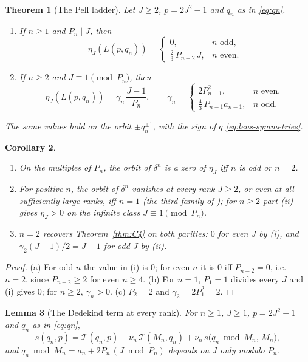 \documentclass[11pt]{article}
\newtheorem{theorem}{Theorem}[section]
\newtheorem{lemma}[theorem]{Lemma}
\newtheorem{corollary}[theorem]{Corollary}
\theoremstyle{definition}
\begin{document}
\begin{theorem}[The Pell ladder]
\label{thm:P}
Let $J\geq2$, $p=2J^2-1$ and $q_n$ as in \eqref{eq:qn}.
\begin{enumerate}[label=(\roman*)]
\item If $n\geq1$ and $P_n\mid J$, then
\[
 \eta_J(L(p,q_n))=\begin{cases}0,&n\text{ odd},\\[2pt]
 \tfrac23\,P_{n-2}\,J,&n\text{ even}.\end{cases}
\]
\item If $n\geq2$ and $J\equiv1\pmod{P_n}$, then
\[
 \eta_J(L(p,q_n))=\gamma_n\,\frac{J-1}{P_n},\qquad
 \gamma_n=\begin{cases}2P_{n-1}^2,&n\text{ even},\\[2pt]
 \tfrac43\,P_{n-1}a_{n-1},&n\text{ odd}.\end{cases}
\]
\end{enumerate}
The same values hold on the orbit $\pm q_n^{\pm1}$, with the sign of $q$
\eqref{eq:lens-symmetries}.
\end{theorem}

\begin{corollary}
\label{cor:P}
\begin{enumerate}[label=(\alph*)]
\item On the multiples of $P_n$, the orbit of $\delta^n$ is a zero of
$\eta_J$ iff $n$ is odd or $n=2$.
\item For positive $n$, the orbit of $\delta^n$ vanishes at every rank
$J\geq2$, or even at all sufficiently large ranks, iff $n=1$ (the third family of
\cite[Thm.~7.1]{MahmoodP1Collection2026}); for $n\geq2$ part (ii) gives
$\eta_J>0$ on the infinite class $J\equiv1\pmod{P_n}$.
\item $n=2$ recovers Theorem~\ref{thm:C4} on both parities: $0$ for even
$J$ by (i), and $\gamma_2(J-1)/2=J-1$ for odd $J$ by (ii).
\end{enumerate}
\end{corollary}

\begin{proof}
(a) For odd $n$ the value in (i) is $0$; for even $n$ it is $0$ iff
$P_{n-2}=0$, i.e.\ $n=2$, since $P_{n-2}\geq2$ for even $n\geq4$.  (b) For
$n=1$, $P_1=1$ divides every $J$ and (i) gives $0$; for $n\geq2$,
$\gamma_n>0$.  (c) $P_2=2$ and $\gamma_2=2P_1^2=2$.
\end{proof}

\begin{lemma}[The Dedekind term at every rank]
\label{lem:S}
For $n\geq1$, $J\geq1$, $p=2J^2-1$ and $q_n$ as in \eqref{eq:qn},
\begin{equation}
 s(q_n,p)=\mathcal T(q_n,p)-\nu_n\,\mathcal T(M_n,q_n)
 +\nu_n\,s\bigl(q_n\bmod M_n,\,M_n\bigr),
 \label{eq:lemma-S}
\end{equation}
and $q_n\bmod M_n=a_n+2P_n\,(J\bmod P_n)$ depends on $J$ only modulo
$P_n$.
\end{lemma}
\end{document}
